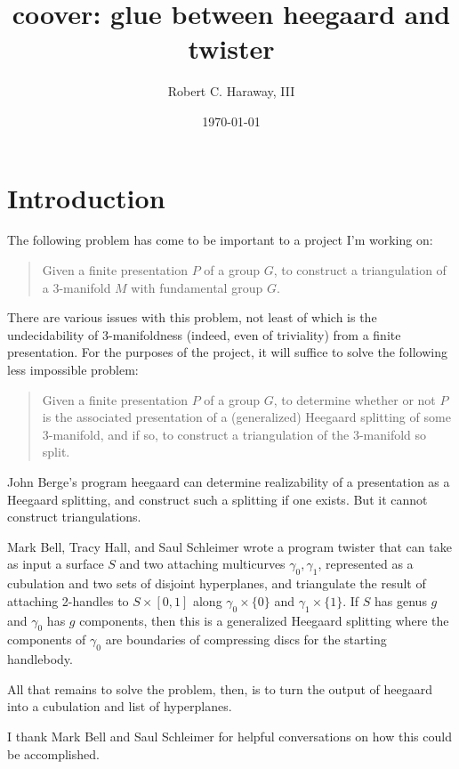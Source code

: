 \documentclass{article}%
\theoremstyle{plain}
\theoremstyle{plain}
\theoremstyle{definition}
\numberwithin{equation}{section}
\begin{document}
\title{{\Tt{}coover\nwendquote}: glue between {\Tt{}heegaard\nwendquote} and {\Tt{}twister\nwendquote}}
\author{Robert C. Haraway, III}
\date{\today}
\maketitle

\section{Introduction}
The following problem
has come to be important to a project I'm working on:
\begin{quotation}
Given a finite presentation $P$ of a group $G$, to
construct a triangulation of a 3-manifold $M$ with
fundamental group $G$.
\end{quotation}
There are various issues with this problem, not least
of which is the undecidability of 3-manifoldness
(indeed, even of triviality) from a finite presentation.
For the purposes of the project, it will suffice to
solve the following less impossible problem:
\begin{quotation}
Given a finite presentation $P$ of a group $G$,
to determine whether or not $P$ is the associated presentation
of a (generalized) Heegaard splitting of some 3-manifold, and if so,
to construct a triangulation of the 3-manifold so split.
\end{quotation}
John Berge's program {\Tt{}heegaard\nwendquote}\cite{heeg} can determine
realizability of a presentation as a Heegaard splitting, and
construct such a splitting if one exists. But it cannot
construct triangulations.

Mark Bell, Tracy Hall, and Saul Schleimer wrote a program
{\Tt{}twister\nwendquote} that can take as input a surface $S$ and two attaching
multicurves $\gamma_0,\gamma_1$, represented as a cubulation and two sets of disjoint
hyperplanes, and triangulate the result of attaching
2-handles to $S \times [0,1]$ along $\gamma_0\times\{0\}$ and $\gamma_1\times\{1\}$.
If $S$ has genus $g$ and $\gamma_0$ has $g$ components, then this is
a generalized Heegaard splitting where the components of $\gamma_0$
are boundaries of compressing discs for the starting handlebody.

All that remains to solve the problem, then, is to turn
the output of {\Tt{}heegaard\nwendquote} into a cubulation and list of hyperplanes.

I thank Mark Bell and Saul Schleimer 
for helpful conversations
on how this could be accomplished.
\end{document}
